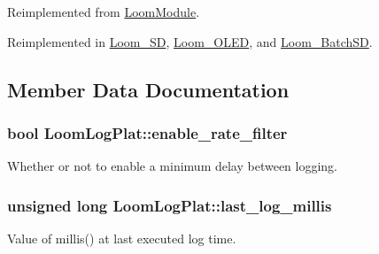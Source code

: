 Reimplemented from \hyperlink{class_loom_module_a4385842da9226014283136b3e37dde88}{Loom\+Module}.



Reimplemented in \hyperlink{class_loom___s_d_a4c0c3f46a3479ed8e4a96c0ca4acfa7e}{Loom\+\_\+\+SD}, \hyperlink{class_loom___o_l_e_d_a20dab0bc2c5bdc139b1b04523a54a78c}{Loom\+\_\+\+O\+L\+ED}, and \hyperlink{class_loom___batch_s_d_ad1566bbb55d145e3206784df245be710}{Loom\+\_\+\+Batch\+SD}.



\subsection{Member Data Documentation}
\subsubsection[{\texorpdfstring{enable\+\_\+rate\+\_\+filter}{enable_rate_filter}}]{\setlength{\rightskip}{0pt plus 5cm}bool Loom\+Log\+Plat\+::enable\+\_\+rate\+\_\+filter\hspace{0.3cm}{\ttfamily [protected]}}\hypertarget{class_loom_log_plat_a6d343b76b79a1e51572bcf2991966e61}{}\label{class_loom_log_plat_a6d343b76b79a1e51572bcf2991966e61}


Whether or not to enable a minimum delay between logging. 

\subsubsection[{\texorpdfstring{last\+\_\+log\+\_\+millis}{last_log_millis}}]{\setlength{\rightskip}{0pt plus 5cm}unsigned long Loom\+Log\+Plat\+::last\+\_\+log\+\_\+millis\hspace{0.3cm}{\ttfamily [protected]}}\hypertarget{class_loom_log_plat_aa6ad61d7d6c126aa13dcc91debef67e3}{}\label{class_loom_log_plat_aa6ad61d7d6c126aa13dcc91debef67e3}


Value of millis() at last executed log time. 

